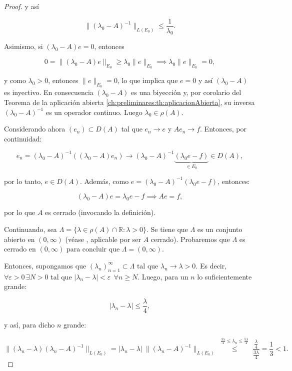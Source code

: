 \begin{proof}
    y así 
    
    \[\lVert (\lambda_0 - A)^{-1} \rVert_{L(E_0)} \leq \frac{1}{\lambda_0}.\]

    Asimismo, si $(\lambda_0 - A)e = 0$, entonces

    \[0 = \lVert (\lambda_0 - A)e \rVert_{E_0} \geq \lambda_0 \lVert e \rVert_{E_0} \implies \lambda_0 \lVert e \rVert_{E_0} = 0,\]

    y como $\lambda_0 > 0$, entonces $\lVert e \rVert_{E_0} = 0$, lo que implica que $e = 0$ y así $(\lambda_0 - A)$ es inyectivo. En consecuencia $(\lambda_0 - A)$ es una biyección y, por corolario del Teorema de la aplicación abierta \ref{ch:preliminares:th:aplicacionAbierta}, su inversa $(\lambda_0 - A)^{-1}$ es un operador continuo. Luego $\lambda_0 \in \rho(A)$.

    Considerando ahora $(e_n) \subset D(A)$ tal que $e_n \rightarrow e$ y $Ae_n \rightarrow f$. Entonces, por continuidad:

    \[e_n = (\lambda_0 - A)^{-1}((\lambda_0 - A)e_n) \rightarrow (\lambda_0 - A)^{-1}\underbrace{(\lambda_0e - f)}_{\in E_0} \in D(A),\]

    por lo tanto, $e \in D(A)$. Además, como $e = (\lambda_0 - A)^{-1}(\lambda_0e - f)$, entonces:

    \[(\lambda_0 - A)e = \lambda_0e - f \implies Ae = f,\]

    por lo que $A$ es cerrado (invocando la definición).

    Continuando, sea $\Lambda = \{\lambda \in \rho(A) \cap \mathbb{R} : \lambda > 0\}$. Se tiene que $\Lambda$ es un conjunto abierto en $(0, \infty)$ (véase \cite[Cap.~VIII, \S 2, Teorema~1]{yosida-1980-fun-ana}, aplicable por ser $A$ cerrado). Probaremos que $\Lambda$ es cerrado en $(0, \infty)$ para concluir que $\Lambda = (0, \infty)$.

    Entonces, supongamos que $(\lambda_n)_{n = 1}^\infty \subset \Lambda$ tal que $\lambda_n \rightarrow \lambda > 0$. Es decir, $\forall \varepsilon > 0 \, \exists N > 0$ tal que $|\lambda_n - \lambda | < \varepsilon \ \ \forall n \geq N$. Luego, para un $n$ lo suficientemente grande:

    \[|\lambda_n - \lambda| \leq \frac{\lambda}{4},\]

    y así, para dicho $n$ grande:

    \[\lVert (\lambda_n - \lambda)(\lambda_n - A)^{-1}\rVert_{L(E_0)} = |\lambda_n - \lambda| \ \lVert (\lambda_n - A)^{-1}\rVert_{L(E_0)} \overset{\substack{\frac{3\lambda}{4} \leq \lambda_n \leq \frac{5\lambda}{4}}}{\leq} \frac{\frac{\lambda}{4}}{\frac{3 \lambda}{4}} = \frac{1}{3} < 1.\]


\end{proof}
